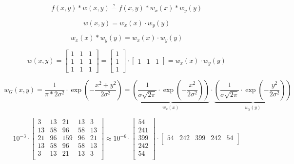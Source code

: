 \documentclass{article}
\begin{document}
\begin{equation}
    f(x,y)*w(x,y) \stackrel{?}{=} f(x,y)*w_{x}(x)*w_{y}(y)
\end{equation}

\begin{equation}
    w(x,y) = w_{x}(x) \cdot w_{y}(y)
\end{equation}

\begin{equation}
   w_{x}(x) * w_{y}(y) = w_{x}(x) \cdot w_{y}(y) 
\end{equation}



\begin{equation}
    w(x,y) =
    \begin{bmatrix}
        1 & 1 & 1 \\
        1 & 1 & 1 \\
        1 & 1 & 1
    \end{bmatrix}
    =
    \begin{bmatrix}
        1 \\
        1 \\
        1
    \end{bmatrix}
    \cdot
    \begin{bmatrix}
    1 & 1 & 1 
    \end{bmatrix}
    =
    w_{x}(x) \cdot w_{y}(y) 
\end{equation}


\begin{equation}
    w_{G}(x,y) = \frac{1}{\pi*2\sigma^2} \cdot \exp\left(-\frac{x^2+y^2}{2\sigma^2}\right)
    = 
    \underbrace{
    \left(
    \frac{1}{\sigma \sqrt{2\pi}} \cdot \exp\left(-\frac{x^2}{2\sigma^2}\right)
    \right)
    }_{w_{x}(x)}
    \cdot
    \underbrace{
    \left(
    \frac{1}{\sigma \sqrt{2\pi}} \cdot
    \exp\left(-\frac{y^2}{2\sigma^2}\right)
    \right)
    }_{w_{y}(y)}
\end{equation}

\begin{equation}
    10^{-3} \cdot
    \begin{bmatrix}
        3 & 13 & 21 & 13 & 3  \\
        13 & 58 & 96 & 58 & 13 \\
        21 & 96 & 159 & 96 & 21\\    
        13 & 58 & 96 & 58 & 13 \\
        3 & 13  & 21 & 13 & 3 \\
    \end{bmatrix}
    \approx   
    10^{-6} \cdot 
    \begin{bmatrix}
        54 \\
        241 \\
        399 \\
        242 \\
        54 \\
    \end{bmatrix}
    \cdot
    \begin{bmatrix}
          54 & 242 & 399 & 242 & 54 \\
    \end{bmatrix}
\end{equation}
\end{document}

